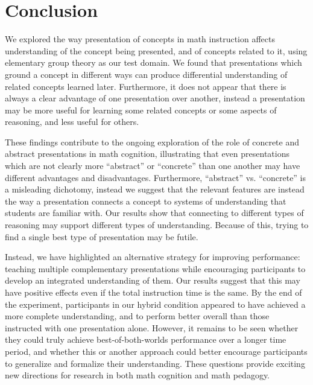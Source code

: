 \documentclass[man,10pt]{apa6}
\begin{document}
\section{Conclusion}
We explored the way presentation of concepts in math instruction affects understanding of the concept being presented, and of concepts related to it, using elementary group theory as our test domain. We found that presentations which ground a concept in different ways can produce differential understanding of related concepts learned later. Furthermore, it does not appear that there is always a clear advantage of one presentation over another, instead a presentation may be more useful for learning some related concepts or some aspects of reasoning, and less useful for others.\par
These findings contribute to the ongoing exploration of the role of concrete and abstract presentations in math cognition, illustrating that even presentations which are not clearly more ``abstract'' or ``concrete'' than one another may have different advantages and disadvantages. Furthermore, ``abstract'' vs. ``concrete'' is a misleading dichotomy, instead we suggest that the relevant features are instead the way a presentation connects a concept to systems of understanding that students are familiar with. Our results show that connecting to different types of reasoning may support different types of understanding. Because of this, trying to find a single best type of presentation may be futile. \par
Instead, we have highlighted an alternative strategy for improving performance: teaching multiple complementary presentations while encouraging participants to develop an integrated understanding of them. Our results suggest that this may have positive effects even if the total instruction time is the same. By the end of the experiment, participants in our hybrid condition appeared to have achieved a more complete understanding, and to perform better overall than those instructed with one presentation alone. However, it remains to be seen whether they could truly achieve best-of-both-worlds performance over a longer time period, and whether this or another approach could better encourage participants to generalize and formalize their understanding. These questions provide exciting new directions for research in both math cognition and math pedagogy. \par
 
\end{document}
